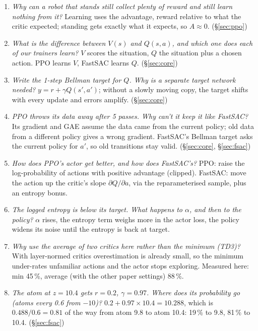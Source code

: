 \documentclass[10pt,letterpaper]{article}
\begin{document}
\begin{small}
\begin{enumerate}[leftmargin=1.5em]
\item \emph{Why can a robot that stands still collect plenty of reward and still learn nothing from it?}
\textcolor{Ink2}{Learning uses the advantage, reward relative to what the critic expected; standing gets exactly what it expects, so $A\approx0$. (§\ref{sec:ppo})}
\item \emph{What is the difference between $V(s)$ and $Q(s,a)$, and which one does each of our trainers learn?}
\textcolor{Ink2}{$V$ scores the situation, $Q$ the situation plus a chosen action. PPO learns $V$, FastSAC learns $Q$. (§\ref{sec:core})}
\item \emph{Write the 1-step Bellman target for $Q$. Why is a separate target network needed?}
\textcolor{Ink2}{$y=r+\gamma Q(s',a')$; without a slowly moving copy, the target shifts with every update and errors amplify. (§\ref{sec:core})}
\item \emph{PPO throws its data away after 5 passes. Why can't it keep it like FastSAC?}
\textcolor{Ink2}{Its gradient and GAE assume the data came from the current policy; old data from a different policy gives a wrong gradient.
FastSAC's Bellman target asks the current policy for $a'$, so old transitions stay valid. (§\ref{sec:core}, §\ref{sec:fsac})}
\item \emph{How does PPO's actor get better, and how does FastSAC's?}
\textcolor{Ink2}{PPO: raise the log-probability of actions with positive advantage (clipped). FastSAC: move the action up the critic's slope
$\partial Q/\partial a$, via the reparameterised sample, plus an entropy bonus.}
\item \emph{The logged entropy is below its target. What happens to $\alpha$, and then to the policy?}
\textcolor{Ink2}{$\alpha$ rises, the entropy term weighs more in the actor loss, the policy widens its noise until the entropy is back at target.}
\item \emph{Why use the average of two critics here rather than the minimum (TD3)?}
\textcolor{Ink2}{With layer-normed critics overestimation is already small, so the minimum under-rates unfamiliar actions and the actor stops
exploring. Measured here: min 45\,\%, average (with the other paper settings) 88\,\%.}
\item \emph{The atom at $z=10.4$ gets $r=0.2$, $\gamma=0.97$. Where does its probability go (atoms every 0.6 from $-10$)?}
\textcolor{Ink2}{$0.2+0.97\times10.4=10.288$, which is $0.488/0.6=0.81$ of the way from atom 9.8 to atom 10.4: 19\,\% to 9.8, 81\,\% to 10.4. (§\ref{sec:fsac})}

\end{enumerate}
\end{small}
\end{document}
